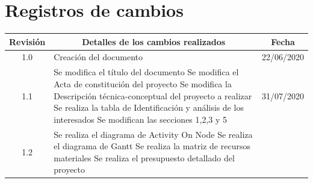 \documentclass[11pt]{charter}
\begin{document}
\maketitle
\thispagestyle{empty}
\pagebreak


\thispagestyle{empty}
{\setlength{\parskip}{0pt}
\tableofcontents{}
}
\pagebreak


\section{Registros de cambios}
\label{sec:registro}


\begin{table}[ht]
\label{tab:registro}
\centering

\begin{tabularx}{\linewidth}{@{}|c|X|c|@{}}
\hline
\rowcolor[HTML]{C0C0C0} 
Revisión & \multicolumn{1}{c|}{\cellcolor[HTML]{C0C0C0}Detalles de los cambios realizados} & Fecha      \\ \hline
1.0      & Creación del documento                                                          & 22/06/2020 \\ \hline
1.1      & Se modifica el título del documento \newline                                                                                Se modifica el Acta de constitución del proyecto \newline                                                                               
Se modifica la Descripción técnica-conceptual del proyecto a realizar \newline                                                                               
Se realiza la tabla de Identificación y análisis de los interesados \newline                                                                               
Se modifican las secciones 1,2,3 y 5 & 31/07/2020 \\ \hline
1.2      & Se realiza el diagrama de Activity On Node \newline                                                                              
Se realiza el diagrama de Gantt\newline                                                                              
Se realiza la matriz de recursos materiales \newline                                                                              
Se realiza el presupuesto detallado del proyecto \newline                                                                              

\end{tabularx}
\end{table}
\end{document}
